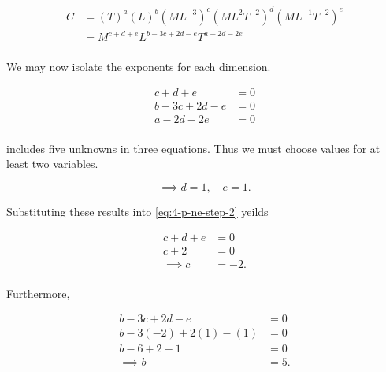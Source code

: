 \documentclass[12pt]{article}
\begin{document}
  \begin{equation}
    \label{eq:4-p-ne-step-1}
    \begin{aligned}
      C &= (T)^a(L)^b(ML^{-3})^c(ML^2T^{-2})^d(ML^{-1}T^{-2})^e \\
        &= M^{c+d+e}L^{b-3c+2d-e}T^{a-2d-2e} \\
    \end{aligned}
  \end{equation}

  We may now isolate the exponents for each dimension.

  \begin{equation}
    \label{eq:4-p-ne-step-2}
    \begin{aligned}
      c + d + e &= 0 \\
      b - 3c + 2d - e &= 0 \\
      a - 2d - 2e &= 0 \\
    \end{aligned}
  \end{equation}

   includes five unknowns in three equations. Thus we
  must choose values for at least two variables.

  \begin{equation}
    \label{eq:4-p-ne-step-3-de}
    \implies d=1, \quad e=1.
  \end{equation}

  Substituting these results into \cref{eq:4-p-ne-step-2} yeilds

  \begin{equation}
    \label{eq:4-p-ne-step-3-c}
    \begin{aligned}
      c+d+e &= 0\\
      c + 2 &= 0\\
      \implies c &= -2.\\
    \end{aligned}
  \end{equation}

  Furthermore,

  \begin{equation}
    \label{eq:4-p-ne-step-3-b}
    \begin{aligned}
      b-3c+2d-e&=0\\
      b-3(-2)+2(1)-(1)&=0 \\
      b-6+2-1&=0 \\
      \implies b&=5.\\
    \end{aligned}
  \end{equation}
\end{document}
